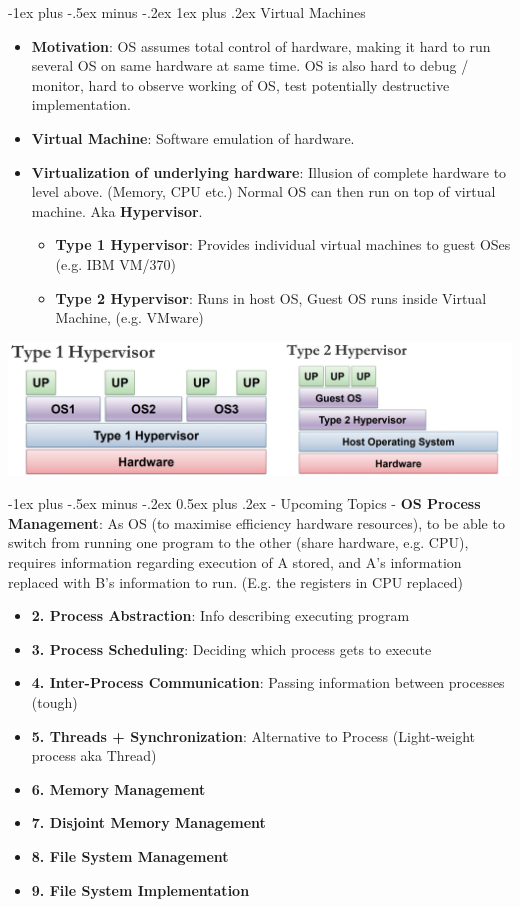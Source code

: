 \documentclass[10pt, landscape]{article}
\makeatletter
\renewcommand{\section}{\@startsection{section}{1}{0mm}%
                                {-1ex plus -.5ex minus -.2ex}%
                                {0.5ex plus .2ex}%
                                {\normalfont\large\bfseries}}
\renewcommand{\subsubsection}{\@startsection{subsubsection}{3}{0mm}%
                                {-1ex plus -.5ex minus -.2ex}%
                                {1ex plus .2ex}%
                                {\normalfont\small\bfseries}}
\makeatother
\begin{document}
\begin{multicols*}{3}
\subsubsection{Virtual Machines}
\begin{itemize}
\item \textbf{Motivation}: OS assumes total control of hardware, making it hard to run several OS on same hardware at same time. OS is also hard to debug / monitor, hard to observe working of OS, test potentially destructive implementation.
\item \textbf{Virtual Machine}: Software emulation of hardware. 
\item \textbf{Virtualization of underlying hardware}: Illusion of complete hardware to level above. (Memory, CPU etc.) Normal OS can then run on top of virtual machine. Aka \textbf{Hypervisor}. 
	\begin{itemize}
	\item \textbf{Type 1 Hypervisor}: Provides individual virtual machines to guest OSes (e.g. IBM VM/370)
	\item \textbf{Type 2 Hypervisor}: Runs in host OS, Guest OS runs inside Virtual Machine, (e.g. VMware)
	\end{itemize}
\end{itemize}
\centerline{\includegraphics[width=0.9\linewidth]{hypervisor}}

\section{- Upcoming Topics -}
\textbf{OS Process Management}: As OS (to maximise efficiency hardware resources), to be able to switch from running one program to the other (share hardware, e.g. CPU), requires information regarding execution of A stored, and A's information replaced with B's information to run. (E.g. the registers in CPU replaced)
\begin{itemize}
	\item \textbf{2. Process Abstraction}: Info describing executing program
	\item \textbf{3. Process Scheduling}: Deciding which process gets to execute
	\item \textbf{4. Inter-Process Communication}: Passing information between processes (tough)
	\item \textbf{5. Threads + Synchronization}: Alternative to Process (Light-weight process aka Thread)
	\item \textbf{6. Memory Management}
	\item \textbf{7. Disjoint Memory Management}
	\item \textbf{8. File System Management}
	\item \textbf{9. File System Implementation}
\end{itemize}



\end{multicols*}
\end{document}
